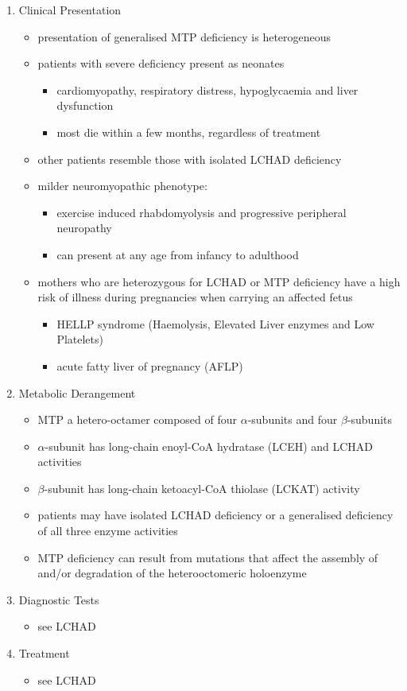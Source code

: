 \documentclass[12pt]{scrartcl}
\begin{document}
\begin{enumerate}
\item Clinical Presentation
\label{sec:orgfd496f2}
\begin{itemize}
\item presentation of generalised MTP deficiency is heterogeneous
\item patients with severe deficiency present as neonates
\begin{itemize}
\item cardiomyopathy, respiratory distress, hypoglycaemia and liver dysfunction
\item most die within a few months, regardless of treatment
\end{itemize}
\item other patients resemble those with isolated LCHAD deficiency
\item milder neuromyopathic phenotype:
\begin{itemize}
\item exercise induced rhabdomyolysis and progressive peripheral
neuropathy
\item can present at any age from infancy to adulthood
\end{itemize}
\item mothers who are heterozygous for LCHAD or MTP deficiency have a high
risk of illness during pregnancies when carrying an affected fetus
\begin{itemize}
\item HELLP syndrome (Haemolysis, Elevated Liver enzymes and Low Platelets)
\item acute fatty liver of pregnancy (AFLP)
\end{itemize}
\end{itemize}
\item Metabolic Derangement
\label{sec:orga4c4956}
\begin{itemize}
\item MTP a hetero-octamer composed of four \(\alpha\)-subunits and four
\(\beta\)-subunits
\item \(\alpha\)-subunit has long-chain enoyl-CoA hydratase (LCEH) and LCHAD
activities
\item \(\beta\)-subunit has long-chain ketoacyl-CoA thiolase (LCKAT) activity
\item patients may have isolated LCHAD deficiency or a generalised
deficiency of all three enzyme activities
\item MTP deficiency can result from mutations that affect the assembly of
and/or degradation of the heterooctomeric holoenzyme
\end{itemize}

\item Diagnostic Tests
\label{sec:orge4555b2}
\begin{itemize}
\item see LCHAD
\end{itemize}

\item Treatment
\label{sec:orgb54cf88}
\begin{itemize}
\item see LCHAD
\end{itemize}
\end{enumerate}
\end{document}
